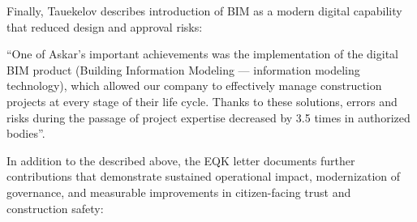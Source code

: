 Finally, Tauekelov describes \mrls introduction of BIM as a modern digital capability that reduced design and approval risks:
\begin{fullquote}
``One of Askar’s important achievements was the implementation of the digital BIM product (Building Information Modeling — information modeling technology), which allowed our company to effectively manage construction projects at every stage of their life cycle. Thanks to these solutions, errors and risks during the passage of project expertise decreased by 3.5 times in authorized bodies''.
\end{fullquote}

In addition to the described above, the EQK letter documents further contributions that demonstrate sustained operational impact, modernization of governance, and measurable improvements in citizen-facing trust and construction safety:
\vspace{-0.5\baselineskip}
